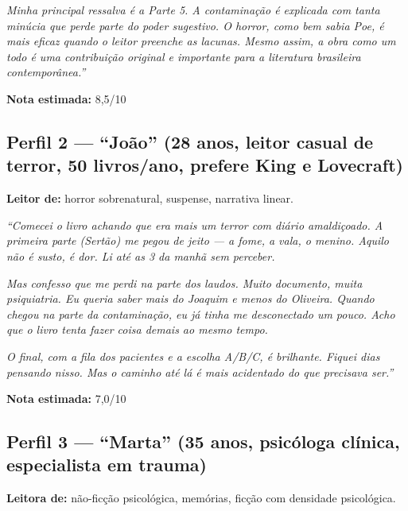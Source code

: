 \documentclass[14pt,openany]{extbook}
\begin{document}
\vspace{0.3em}
\noindent\textit{Minha principal ressalva é a Parte 5. A contaminação é explicada com tanta minúcia que perde parte do poder sugestivo. O horror, como bem sabia Poe, é mais eficaz quando o leitor preenche as lacunas. Mesmo assim, a obra como um todo é uma contribuição original e importante para a literatura brasileira contemporânea.''}

\vspace{0.3em}
\noindent\textbf{Nota estimada:} 8,5/10

\vspace{0.8em}

\subsection*{Perfil 2 --- ``João'' (28 anos, leitor casual de terror, 50 livros/ano, prefere King e Lovecraft)}

\textbf{Leitor de:} horror sobrenatural, suspense, narrativa linear.

\vspace{0.3em}
\noindent\textit{``Comecei o livro achando que era mais um terror com diário amaldiçoado. A primeira parte (Sertão) me pegou de jeito --- a fome, a vala, o menino. Aquilo não é susto, é dor. Li até as 3 da manhã sem perceber.}

\vspace{0.3em}
\noindent\textit{Mas confesso que me perdi na parte dos laudos. Muito documento, muita psiquiatria. Eu queria saber mais do Joaquim e menos do Oliveira. Quando chegou na parte da contaminação, eu já tinha me desconectado um pouco. Acho que o livro tenta fazer coisa demais ao mesmo tempo.}

\vspace{0.3em}
\noindent\textit{O final, com a fila dos pacientes e a escolha A/B/C, é brilhante. Fiquei dias pensando nisso. Mas o caminho até lá é mais acidentado do que precisava ser.''}

\vspace{0.3em}
\noindent\textbf{Nota estimada:} 7,0/10

\vspace{0.8em}

\subsection*{Perfil 3 --- ``Marta'' (35 anos, psicóloga clínica, especialista em trauma)}

\textbf{Leitora de:} não-ficção psicológica, memórias, ficção com densidade psicológica.
\end{document}
